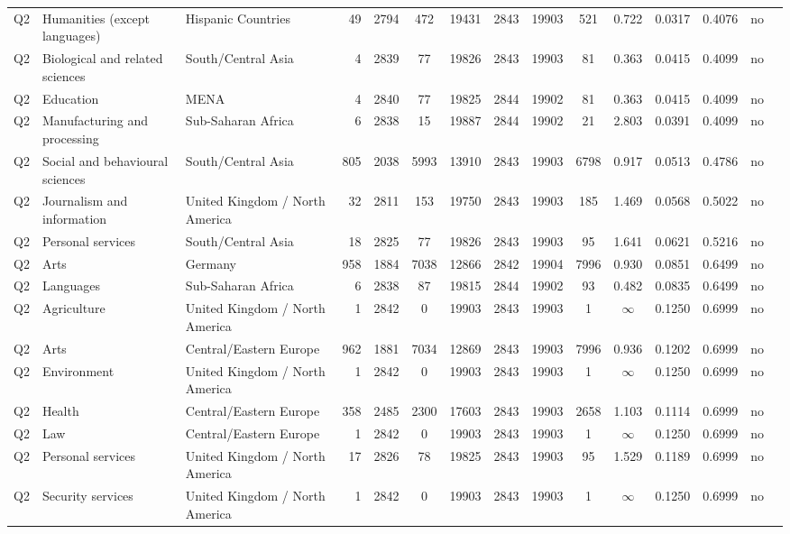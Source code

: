 \begin{longtable}{lllrcccccccccll}
Q2 & Humanities (except languages) & Hispanic Countries & 49 & 2794 & 472 & 19431 & 2843 & 19903 & 521 & 0.722 & 0.0317 & 0.4076 & no \\
Q2 & Biological and related sciences & South/Central Asia & 4 & 2839 & 77 & 19826 & 2843 & 19903 & 81 & 0.363 & 0.0415 & 0.4099 & no \\
Q2 & Education & MENA & 4 & 2840 & 77 & 19825 & 2844 & 19902 & 81 & 0.363 & 0.0415 & 0.4099 & no \\
Q2 & Manufacturing and processing & Sub-Saharan Africa & 6 & 2838 & 15 & 19887 & 2844 & 19902 & 21 & 2.803 & 0.0391 & 0.4099 & no \\
Q2 & Social and behavioural sciences & South/Central Asia & 805 & 2038 & 5993 & 13910 & 2843 & 19903 & 6798 & 0.917 & 0.0513 & 0.4786 & no \\
Q2 & Journalism and information & United Kingdom / North America & 32 & 2811 & 153 & 19750 & 2843 & 19903 & 185 & 1.469 & 0.0568 & 0.5022 & no \\
Q2 & Personal services & South/Central Asia & 18 & 2825 & 77 & 19826 & 2843 & 19903 & 95 & 1.641 & 0.0621 & 0.5216 & no \\
Q2 & Arts & Germany & 958 & 1884 & 7038 & 12866 & 2842 & 19904 & 7996 & 0.930 & 0.0851 & 0.6499 & no \\
Q2 & Languages & Sub-Saharan Africa & 6 & 2838 & 87 & 19815 & 2844 & 19902 & 93 & 0.482 & 0.0835 & 0.6499 & no \\
Q2 & Agriculture & United Kingdom / North America & 1 & 2842 & 0 & 19903 & 2843 & 19903 & 1 & $\infty$ & 0.1250 & 0.6999 & no \\
Q2 & Arts & Central/Eastern Europe & 962 & 1881 & 7034 & 12869 & 2843 & 19903 & 7996 & 0.936 & 0.1202 & 0.6999 & no \\
Q2 & Environment & United Kingdom / North America & 1 & 2842 & 0 & 19903 & 2843 & 19903 & 1 & $\infty$ & 0.1250 & 0.6999 & no \\
Q2 & Health & Central/Eastern Europe & 358 & 2485 & 2300 & 17603 & 2843 & 19903 & 2658 & 1.103 & 0.1114 & 0.6999 & no \\
Q2 & Law & Central/Eastern Europe & 1 & 2842 & 0 & 19903 & 2843 & 19903 & 1 & $\infty$ & 0.1250 & 0.6999 & no \\
Q2 & Personal services & United Kingdom / North America & 17 & 2826 & 78 & 19825 & 2843 & 19903 & 95 & 1.529 & 0.1189 & 0.6999 & no \\
Q2 & Security services & United Kingdom / North America & 1 & 2842 & 0 & 19903 & 2843 & 19903 & 1 & $\infty$ & 0.1250 & 0.6999 & no \\

\end{longtable}
